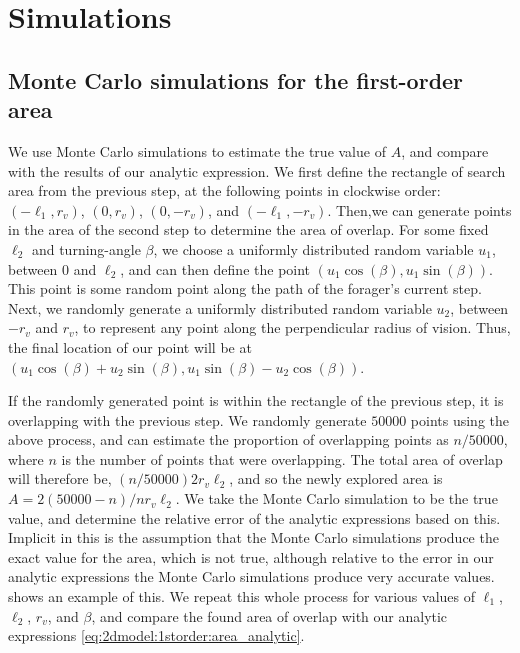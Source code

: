 \section{Simulations}
\label{sec:2dmodel:simulations}
\subsection{Monte Carlo simulations for the first-order area}
\label{sec:2dmodel:simulations:MC_area}
We use Monte Carlo simulations to estimate the true value of $A$, and compare with the results of our analytic expression. We first define the rectangle of search area from the previous step, at the following points in clockwise order: $(-\ell_1,r_v)$, $(0,r_v)$, $(0,-r_v)$, and $(-\ell_1,-r_v)$. Then,we can generate points in the area of the second step to determine the area of overlap. For some fixed $\ell_2$ and turning-angle $\beta$, we choose a uniformly distributed random variable $u_1$, between $0$ and $\ell_2$, and can then define the point $(u_1 \cos(\beta),u_1 \sin(\beta))$. This point is some random point along the path of the forager's current step. Next, we randomly generate a uniformly distributed random variable $u_2$, between $-r_v$ and $r_v$, to represent any point along the perpendicular radius of vision. Thus, the final location of our point will be at $\left(u_1 \cos(\beta)+u_2\sin(\beta), u_1 \sin(\beta) - u_2 \cos(\beta)\right)$.

If the randomly generated point is within the rectangle of the previous step, it is overlapping with the previous step. We randomly generate $50000$ points using the above process, and can estimate the proportion of overlapping points as $n/50000$, where $n$ is the number of points that were overlapping. The total area of overlap will therefore be, $(n/50000) 2 r_v \ell_2$, and so the newly explored area is $A=2(50000-n)/n r_v \ell_2$. We take the Monte Carlo simulation to be the true value, and determine the relative error of the analytic expressions based on this. Implicit in this is the assumption that the Monte Carlo simulations produce the exact value for the area, which is not true, although relative to the error in our analytic expressions the Monte Carlo simulations produce very accurate values.  shows an example of this. We repeat this whole process for various values of $\ell_1$, $\ell_2$, $r_v$, and $\beta$, and compare the found area of overlap with our analytic expressions \cref{eq:2dmodel:1storder:area_analytic}.

